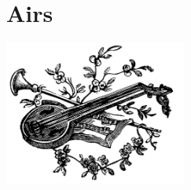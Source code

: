 \documentclass[12pt]{report}
\begin{document}
\chapter*{Airs}
\begin{center}
\includegraphics[width=6cm]{../images/misc}
\end{center}


\end{document}
